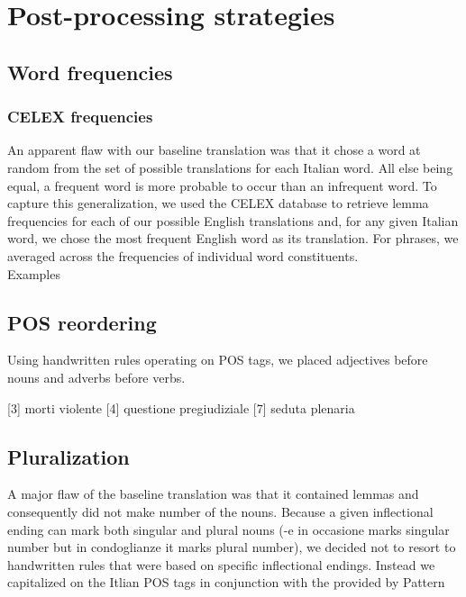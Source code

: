 \documentclass{article}
\begin{document}
\section{Post-processing strategies}

\subsection{Word frequencies}

\subsubsection{CELEX frequencies}

An apparent flaw with our baseline translation was that it chose a word at random from the set of possible translations for each Italian word. All else being equal, a frequent word is more probable to occur than an infrequent word. To capture this generalization, we used the CELEX database to retrieve lemma frequencies for each of our possible English translations and, for any given Italian word, we chose the most frequent English word as its translation. For phrases, we averaged across the frequencies of individual word constituents.\\

Examples

  
\subsection{POS reordering}

Using handwritten rules operating on POS tags, we placed adjectives before nouns and adverbs before verbs.

[3] morti violente
[4] questione pregiudiziale
[7] seduta plenaria 

\subsection{Pluralization}

A major flaw of the baseline translation was that it contained lemmas and consequently did not make number of the nouns. Because a given inflectional ending can mark both singular and plural nouns (-e in occasione marks singular number but in condoglianze it marks plural number), we decided not to resort to handwritten rules that were based on specific inflectional endings. Instead we capitalized on the Itlian POS tags in conjunction with the provided by Pattern \\
\end{document}
